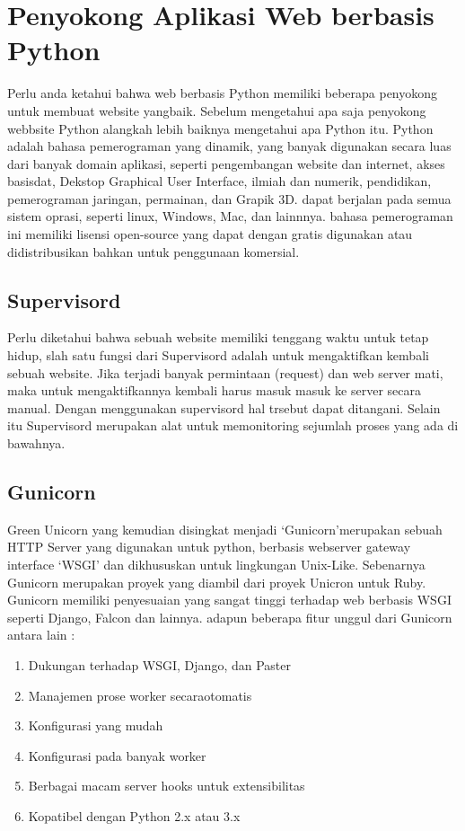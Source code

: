 \section{Penyokong Aplikasi Web berbasis Python}
\par Perlu anda ketahui bahwa web berbasis Python memiliki beberapa penyokong untuk membuat website yangbaik.
Sebelum mengetahui apa saja penyokong webbsite Python alangkah lebih baiknya mengetahui apa Python itu.
Python adalah bahasa pemerograman yang dinamik, yang banyak digunakan secara luas dari banyak domain aplikasi, 
seperti pengembangan website dan internet, akses basisdat, Dekstop Graphical User Interface, ilmiah dan numerik, pendidikan,
pemerograman jaringan, permainan, dan Grapik 3D. dapat berjalan pada semua sistem oprasi, seperti linux, Windows, Mac, dan lainnnya.
bahasa pemerograman ini memiliki lisensi open-source yang dapat dengan gratis digunakan atau didistribusikan bahkan untuk penggunaan komersial\cite{andros2015implementasi}.

\subsection{Supervisord}
\par Perlu diketahui bahwa sebuah website memiliki tenggang waktu untuk tetap hidup, slah satu fungsi dari Supervisord adalah untuk mengaktifkan 
kembali sebuah website. Jika terjadi banyak permintaan (request) dan web server mati, maka untuk mengaktifkannya kembali harus masuk masuk ke server secara manual.
Dengan menggunakan supervisord hal trsebut dapat ditangani. Selain itu Supervisord merupakan alat untuk memonitoring sejumlah proses yang ada di bawahnya.  

\subsection{Gunicorn}
\par Green Unicorn yang kemudian disingkat menjadi `Gunicorn'merupakan sebuah HTTP Server yang digunakan untuk python, berbasis webserver gateway interface `WSGI' dan dikhususkan 
untuk lingkungan Unix-Like. Sebenarnya Gunicorn merupakan proyek yang diambil dari proyek Unicron untuk Ruby. Gunicorn memiliki penyesuaian yang sangat tinggi terhadap web berbasis WSGI 
seperti Django, Falcon dan lainnya. adapun beberapa fitur unggul dari Gunicorn antara lain :


\begin{enumerate}
\item Dukungan terhadap WSGI, Django, dan Paster
\item Manajemen prose worker secaraotomatis
\item Konfigurasi yang mudah
\item Konfigurasi pada banyak worker
\item Berbagai macam server hooks untuk extensibilitas
\item Kopatibel dengan Python 2.x atau 3.x
\end{enumerate}
